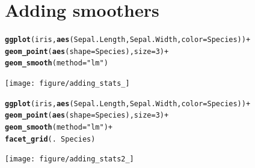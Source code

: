 \documentclass{beamer}\usepackage[]{graphicx}\usepackage[]{color}
\makeatletter
\newcommand{\hlstr}[1]{\textcolor[rgb]{0.192,0.494,0.8}{#1}}%
\newcommand{\hlkwd}[1]{\textcolor[rgb]{0.737,0.353,0.396}{\textbf{#1}}}%
\newenvironment{kframe}{%
 \def\at@end@of@kframe{}%
 \ifinner\ifhmode%
  \def\at@end@of@kframe{\end{minipage}}%
  \begin{minipage}{\columnwidth}%
 \fi\fi%
 \def\FrameCommand##1{\hskip\@totalleftmargin \hskip-\fboxsep
 \colorbox{shadecolor}{##1}\hskip-\fboxsep
     \hskip-\linewidth \hskip-\@totalleftmargin \hskip\columnwidth}%
 \MakeFramed {\advance\hsize-\width
   \@totalleftmargin\z@ \linewidth\hsize
   \@setminipage}}%
 {\par\unskip\endMakeFramed%
 \at@end@of@kframe}
\newenvironment{knitrout}{}{} %
\makeatother
\begin{document}

\section*{Adding smoothers}
\frame{\sectionpage}


\begin{frame}[fragile]
\begin{knitrout}\footnotesize
{}\color{fgcolor}\begin{kframe}
\begin{alltt}
\hlkwd{ggplot}(iris, \hlkwd{aes}(Sepal.Length, Sepal.Width, color = Species)) +
\hlkwd{geom_point}(\hlkwd{aes}(shape = Species), size = 3) +
\hlkwd{geom_smooth}(method = \hlstr{"lm"})
\end{alltt}
\end{kframe}

{\centering \texttt{[image: figure/adding\_stats\_]} 

}



\end{knitrout}

\end{frame}


\begin{frame}[fragile]
\begin{knitrout}\footnotesize
{}\color{fgcolor}\begin{kframe}
\begin{alltt}
\hlkwd{ggplot}(iris, \hlkwd{aes}(Sepal.Length, Sepal.Width, color = Species)) +
\hlkwd{geom_point}(\hlkwd{aes}(shape = Species), size = 3) +
\hlkwd{geom_smooth}(method = \hlstr{"lm"}) +
\hlkwd{facet_grid}(. ~ Species)
\end{alltt}
\end{kframe}

{\centering \texttt{[image: figure/adding\_stats2\_]} 

}



\end{knitrout}

\end{frame}
\end{document}
